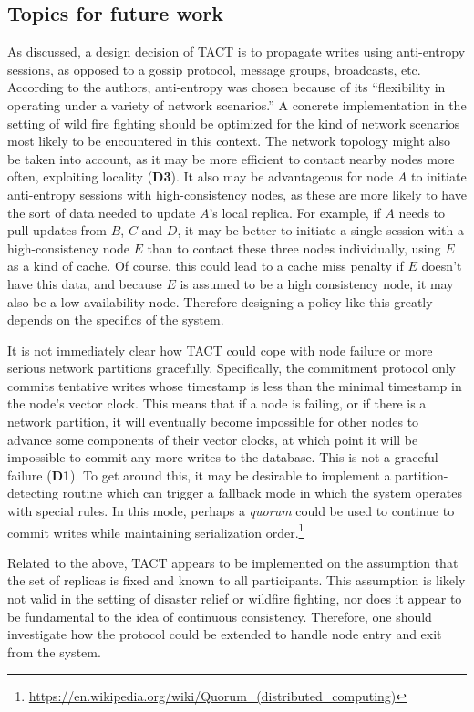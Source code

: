 \subsection{Topics for future work}
As discussed, a design decision of TACT is to propagate writes using
anti-entropy sessions, as opposed to a gossip protocol, message groups,
broadcasts, etc. According to the authors, anti-entropy was chosen because of
its ``flexibility in operating under a variety of network scenarios.''
\cite{2002tact} A concrete implementation in the  setting of wild fire fighting should be
optimized for the kind of network scenarios most likely to be encountered in
this context. The network topology might also be taken into account, as it may
be more efficient to contact nearby nodes more often, exploiting locality
(\textbf{D3}). It also may be advantageous for node $A$ to initiate anti-entropy
sessions with high-consistency nodes, as these are more likely to have the sort
of data needed to update $A$'s local replica. For example, if $A$ needs to pull
updates from $B$, $C$ and $D$, it may be better to initiate a single session
with a high-consistency node $E$ than to contact these three nodes individually,
using $E$ as a kind of cache. Of course, this could lead to a cache miss penalty
if $E$ doesn't have this data, and because $E$ is assumed to be a high
consistency node, it may also be a low availability node. Therefore designing a
policy like this greatly depends on the specifics of the system.

It is not immediately clear how TACT could cope with node failure or more
serious network partitions gracefully. Specifically, the commitment protocol
only commits tentative writes whose timestamp is less than the minimal timestamp
in the node's vector clock. This means that if a node is failing, or if there is
a network partition, it will eventually become impossible for other nodes to
advance some components of their vector clocks, at which point it will be
impossible to commit any more writes to the database. This is not a graceful
failure (\textbf{D1}). To get around this, it may be desirable to implement a
partition-detecting routine which can trigger a fallback mode in which the
system operates with special rules. In this mode, perhaps a \emph{quorum} could
be used to continue to commit writes while maintaining serialization
order.\footnote{
  \url{https://en.wikipedia.org/wiki/Quorum_(distributed_computing)}}

Related to the above, TACT appears to be implemented on the assumption that the
set of replicas is fixed and known to all participants. This assumption is
likely not valid in the setting of disaster relief or wildfire fighting, nor does it appear to be fundamental to
the idea of continuous consistency. Therefore, one should investigate how the
protocol could be extended to handle node entry and exit from the system.

